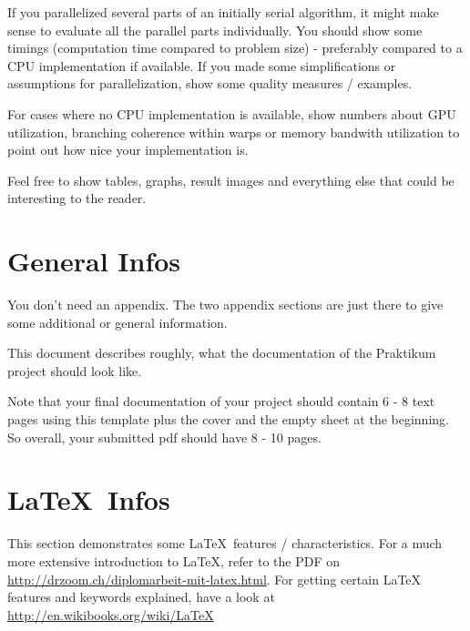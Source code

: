 \documentclass{utue} %
\begin{document}
If you parallelized several parts of an initially serial algorithm, it might make sense to evaluate all the parallel parts individually. You should show some timings (computation time compared to problem size) - preferably compared to a CPU implementation if available.  If you made some simplifications or assumptions for parallelization, show some quality measures / examples.

For cases where no CPU implementation is available, show numbers about GPU utilization, branching coherence within warps or memory bandwith utilization to point out how nice your implementation is.

Feel free to show tables, graphs, result images and everything else that could be interesting to the reader.

\appendix

\section{General Infos}

You don't need an appendix. The two appendix sections are just there to give some additional or general information.

This document describes roughly, what the documentation of the Praktikum project should look like.

Note that your final documentation of your project should contain 6 - 8 text pages using this template plus the cover and the empty sheet at the beginning. So overall, your submitted pdf should have 8 - 10 pages.

\section{\LaTeX~Infos}

This section demonstrates some \LaTeX~features / characteristics. For a much more extensive introduction to \LaTeX, refer to the PDF on \url{http://drzoom.ch/diplomarbeit-mit-latex.html}. For getting certain LaTeX features and keywords explained, have a look at \url{http://en.wikibooks.org/wiki/LaTeX}
\end{document}
